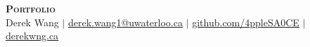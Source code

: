 \documentclass[letterpaper,11pt]{article}
\begin{document}
\begin{center}
    \textbf{\Huge \scshape Portfolio} \\ \vspace{4pt}
    \small Derek Wang $|$ \href{mailto:derek.wang1@uwaterloo.ca}{\underline{derek.wang1@uwaterloo.ca}} $|$
    \href{https://github.com/4ppleSA0CE}{\underline{github.com/4ppleSA0CE}} $|$
    \href{https://www.derekwng.ca/}{\underline{derekwng.ca}}
\end{center}
\vspace{-16pt}

\newcommand{\lnk}[2]{\href{#1}{\underline{#2}}}
\newenvironment{points}{\begin{itemize}[leftmargin=0.17in, itemsep=1.5pt, topsep=2pt, parsep=0pt, partopsep=0pt, beginpenalty=10000]}{\end{itemize}}
\newcommand{\lead}[1]{\textbf{#1.}\ }
\setlength{\abovedisplayskip}{4pt}\setlength{\belowdisplayskip}{4pt}
\setlength{\abovedisplayshortskip}{2pt}\setlength{\belowdisplayshortskip}{2pt}
\end{document}
